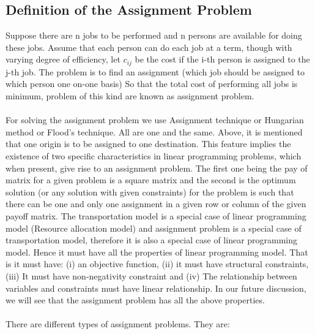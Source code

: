 \subsection{Definition of the Assignment Problem}
Suppose there are n jobs to be performed and n persons are available for doing these jobs. Assume that each person can do each job at a term, though with varying degree of efficiency, let $ c_{ij} $ be the cost if the i-th person is assigned to the j-th job. The problem is to find an assignment (which job should be assigned to which person one on-one basis) So that the total cost of performing all jobs is minimum, problem of this kind are known as assignment problem.\\\\
For solving the assignment problem we use Assignment technique or Hungarian method or Flood's technique. All are one and the same. Above, it is mentioned that one origin is to be assigned to one destination. This feature implies the existence of two specific characteristics in linear programming problems, which when present, give rise to an assignment problem. The first one being the pay of matrix for a given problem is a square matrix and the second is the optimum solution (or any solution with given constraints) for the problem is such that there can be one and only one assignment in a given row or column of the given payoff matrix. The transportation model is a special case of linear programming model (Resource allocation model) and assignment problem is a special case of transportation model, therefore it is also a special case of linear programming model. Hence it must have all the properties of linear programming model. That is it must have: (i) an objective function, (ii) it must have structural constraints, (iii) It must have non-negativity constraint and (iv) The relationship between variables and constraints must have linear relationship. In our future discussion, we will see that the assignment problem has all the above properties.\\\\
There are different types of assignment problems. They are:

